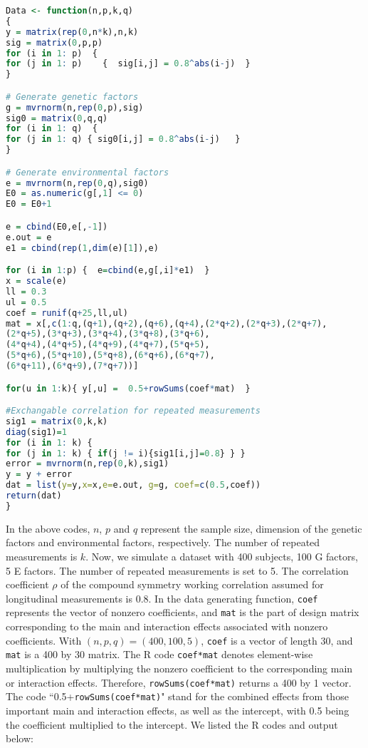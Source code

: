 \documentclass[12pt]{article}
\begin{document}
\begin{lstlisting}[language=R]
Data <- function(n,p,k,q)
{
y = matrix(rep(0,n*k),n,k) 
sig = matrix(0,p,p)     
for (i in 1: p)  { 
for (j in 1: p)    {  sig[i,j] = 0.8^abs(i-j)  }        
}

# Generate genetic factors
g = mvrnorm(n,rep(0,p),sig) 
sig0 = matrix(0,q,q)    
for (i in 1: q)  {
for (j in 1: q) { sig0[i,j] = 0.8^abs(i-j)   }          
}

# Generate environmental factors
e = mvrnorm(n,rep(0,q),sig0)
E0 = as.numeric(g[,1] <= 0)
E0 = E0+1

e = cbind(E0,e[,-1])
e.out = e
e1 = cbind(rep(1,dim(e)[1]),e)

for (i in 1:p) {  e=cbind(e,g[,i]*e1)  }
x = scale(e)
ll = 0.3
ul = 0.5
coef = runif(q+25,ll,ul)
mat = x[,c(1:q,(q+1),(q+2),(q+6),(q+4),(2*q+2),(2*q+3),(2*q+7),
(2*q+5),(3*q+3),(3*q+4),(3*q+8),(3*q+6),
(4*q+4),(4*q+5),(4*q+9),(4*q+7),(5*q+5),
(5*q+6),(5*q+10),(5*q+8),(6*q+6),(6*q+7),
(6*q+11),(6*q+9),(7*q+7))]

for(u in 1:k){ y[,u] =  0.5+rowSums(coef*mat)  }

#Exchangable correlation for repeated measurements
sig1 = matrix(0,k,k)
diag(sig1)=1
for (i in 1: k) {
for (j in 1: k) { if(j != i){sig1[i,j]=0.8} } }
error = mvrnorm(n,rep(0,k),sig1)
y = y + error
dat = list(y=y,x=x,e=e.out, g=g, coef=c(0.5,coef))
return(dat)    
}
\end{lstlisting}

In the above codes, $n$, $p$ and $q$ represent the sample size, dimension of the genetic factors and environmental factors, respectively. The number of repeated measurements is $k$. Now, we simulate a dataset with 400 subjects, 100 G factors, 5 E factors. The number of repeated measurements is set to 5. The correlation coefficient $\rho$ of the compound symmetry working correlation assumed for longitudinal measurements is 0.8. {\color{blue} In the data generating function, \texttt{coef} represents the vector of nonzero coefficients, and \texttt{mat} is the part of design matrix corresponding to the main and interaction effects associated with nonzero coefficients. With $(n,p,q)=(400,100,5)$, \texttt{coef} is a vector of length 30, and \texttt{mat} is a 400 by 30 matrix. The R code \texttt{coef*mat} denotes element-wise multiplication by multiplying the nonzero coefficient to the corresponding main or interaction effects. Therefore, \texttt{rowSums(coef*mat)} returns a 400 by 1 vector. The code ``0.5+\texttt{rowSums(coef*mat)}" stand for the combined effects from those important main and interaction effects, as well as the intercept, with 0.5 being the coefficient multiplied to the intercept.} We listed the R codes and output below:
\end{document}
